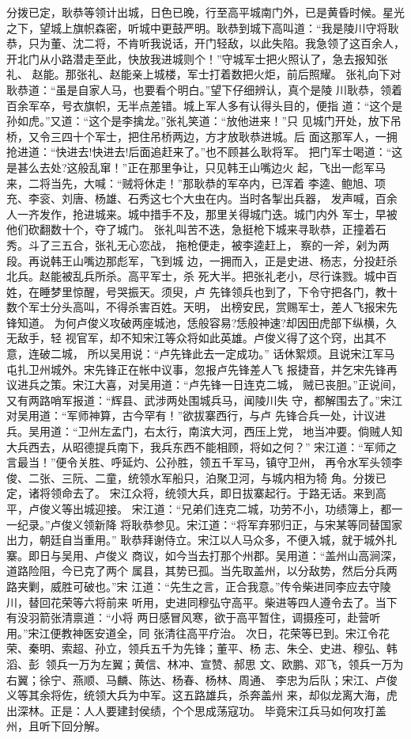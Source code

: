 分拨已定，耿恭等领计出城，日色已晚，行至高平城南门外，已是黄昏时候。星光
之下，望城上旗帜森密，听城中更鼓严明。耿恭到城下高叫道：“我是陵川守将耿
恭，只为董、沈二将，不肯听我说话，开门轻敌，以此失陷。我急领了这百余人，
开北门从小路潜走至此，快放我进城则个！”守城军士把火照认了，急去报知张礼、
赵能。那张礼、赵能亲上城楼，军士打着数把火炬，前后照耀。
张礼向下对耿恭道：“虽是自家人马，也要看个明白。”望下仔细辨认，真个是陵
川耿恭，领着百余军卒，号衣旗帜，无半点差错。城上军人多有认得头目的，便指
道：“这个是孙如虎。”又道：“这个是李擒龙。”张礼笑道：“放他进来！”只
见城门开处，放下吊桥，又令三四十个军士，把住吊桥两边，方才放耿恭进城。后
面这那军人，一拥抢进道：“快进去!快进去!后面追赶来了。”也不顾甚么耿将军。
把门军士喝道：“这是甚么去处?这般乱窜！”正在那里争让，只见韩王山嘴边火
起，飞出一彪军马来，二将当先，大喊：“贼将休走！”那耿恭的军卒内，已浑着
李逵、鲍旭、项充、李衮、刘唐、杨雄、石秀这七个大虫在内。当时各掣出兵器，
发声喊，百余人一齐发作，抢进城来。城中措手不及，那里关得城门迭。城门内外
军士，早被他们砍翻数十个，夺了城门。
张礼叫苦不迭，急挺枪下城来寻耿恭，正撞着石秀。斗了三五合，张礼无心恋战，
拖枪便走，被李逵赶上，察的一斧，剁为两段。再说韩王山嘴边那彪军，飞到城
边，一拥而入，正是史进、杨志，分投赶杀北兵。赵能被乱兵所杀。高平军士，杀
死大半。把张礼老小，尽行诛戮。城中百姓，在睡梦里惊醒，号哭振天。须臾，卢
先锋领兵也到了，下令守把各门，教十数个军士分头高叫，不得杀害百姓。天明，
出榜安民，赏赐军士，差人飞报宋先锋知道。
为何卢俊义攻破两座城池，恁般容易?恁般神速?却因田虎部下纵横，久无敌手，轻
视官军，却不知宋江等众将如此英雄。卢俊义得了这个窍，出其不意，连破二城，
所以吴用说：“卢先锋此去一定成功。”
话休絮烦。且说宋江军马屯扎卫州城外。宋先锋正在帐中议事，忽报卢先锋差人飞
报捷音，并乞宋先锋再议进兵之策。宋江大喜，对吴用道：“卢先锋一日连克二城，
贼已丧胆。”正说间，又有两路哨军报道：“辉县、武涉两处围城兵马，闻陵川失
守，都解围去了。”宋江对吴用道：“军师神算，古今罕有！”欲拔寨西行，与卢
先锋合兵一处，计议进兵。吴用道：“卫州左孟门，右太行，南滨大河，西压上党，
地当冲要。倘贼人知大兵西去，从昭德提兵南下，我兵东西不能相顾，将如之何？”
宋江道：“军师之言最当！”便令关胜、呼延灼、公孙胜，领五千军马，镇守卫州，
再令水军头领李俊、二张、三阮、二童，统领水军船只，泊聚卫河，与城内相为犄
角。分拨已定，诸将领命去了。
宋江众将，统领大兵，即日拔寨起行。于路无话。来到高平，卢俊义等出城迎接。
宋江道：“兄弟们连克二城，功劳不小，功绩簿上，都一一纪录。”卢俊义领新降
将耿恭参见。宋江道：“将军弃邪归正，与宋某等同替国家出力，朝廷自当重用。”
耿恭拜谢侍立。宋江以人马众多，不便入城，就于城外扎寨。即日与吴用、卢俊义
商议，如今当去打那个州郡。吴用道：“盖州山高涧深，道路险阻，今已克了两个
属县，其势已孤。当先取盖州，以分敌势，然后分兵两路夹剿，威胜可破也。”宋
江道：“先生之言，正合我意。”传令柴进同李应去守陵川，替回花荣等六将前来
听用，史进同穆弘守高平。柴进等四人遵令去了。当下有没羽箭张清禀道：“小将
两日感冒风寒，欲于高平暂住，调摄痊可，赴营听用。”宋江便教神医安道全，同
张清往高平疗治。
次日，花荣等已到。宋江令花荣、秦明、索超、孙立，领兵五千为先锋；董平、杨
志、朱仝、史进、穆弘、韩滔、彭，领兵一万为左翼；黄信、林冲、宣赞、郝思
文、欧鹏、邓飞，领兵一万为右翼；徐宁、燕顺、马麟、陈达、杨春、杨林、周通、
李忠为后队；宋江、卢俊义等其余将佐，统领大兵为中军。这五路雄兵，杀奔盖州
来，却似龙离大海，虎出深林。正是：人人要建封侯绩，个个思成荡寇功。
毕竟宋江兵马如何攻打盖州，且听下回分解。